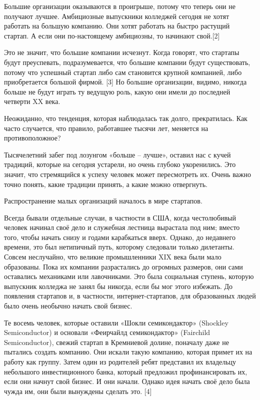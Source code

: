 \documentclass[ebook,12pt,oneside,openany]{memoir}
\begin{document}
Большие организации оказываются в проигрыше, потому что теперь они не
получают лучшее. Амбициозные выпускники колледжей сегодня не хотят
работать на большую компанию. Они хотят работать на быстро растущий
стартап. А если они по-настоящему амбициозны, то начинают свой.[2]

Это не значит, что большие компании исчезнут. Когда говорят, что
стартапы будут преуспевать, подразумевается, что большие компании
будут существовать, потому что успешный стартап либо сам становится
крупной компанией, либо приобретается большой фирмой. [3] Но большие
организации, видимо, никогда больше не будут играть ту ведущую роль,
какую они имели до последней четверти XX века.

Неожиданно, что тенденция, которая наблюдалась так долго,
прекратилась. Как часто случается, что правило, работавшее тысячи лет,
меняется на противоположное?

Тысячелетний забег под лозунгом «больше – лучше», оставил нас с кучей
традиций, которые на сегодня устарели, но очень глубоко укоренились.
Это значит, что стремящийся к успеху человек может пересмотреть их.
Очень важно точно понять, какие традиции принять, а какие можно
отвергнуть.

Распространение малых организаций началось в мире стартапов.

Всегда бывали отдельные случаи, в частности в США, когда честолюбивый
человек начинал своё дело и служебная лестница вырастала под ним;
вместо того, чтобы начать снизу и годами карабкаться вверх. Однако, до
недавнего времени, это был нетипичный путь, которому следовали только
дилетанты. Совсем неслучайно, что великие промышленники XIX века были
мало образованы. Пока их компании разрастались до огромных размеров,
они сами оставались механиками или лавочниками. Это была социальная
ступень, которую выпускник колледжа не занял бы никогда, если бы мог
этого избежать. До появления стартапов и, в частности,
интернет-стартапов, для образованных людей было очень необычно начать
свой бизнес.

Те восемь человек, которые оставили «Шокли семикондактор» (Shockley
Semiconductor) и основали «Феирчайлд семикондактор» (Fairchild
Semiconductor), свежий стартап в Кремниевой долине, поначалу даже не
пытались создать компанию. Они искали такую компанию, которая примет
их на работу как группу. Затем один из родителей ребят представил их
владельцу небольшого инвестиционного банка, который предложил
профинансировать их, если они начнут свой бизнес. И они начали. Однако
идея начать своё дело была чужда им, они были вынуждены сделать это.
[4]
\end{document}
